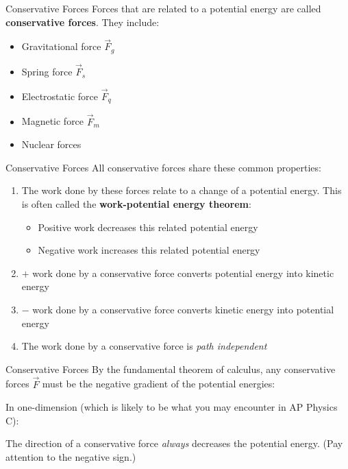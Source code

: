 \documentclass[12pt,compress,aspectratio=169]{beamer}
\begin{document}
\begin{frame}{Conservative Forces}
  Forces that are related to a potential energy are called
  \textbf{conservative forces}. They include:
  \begin{itemize}
  \item Gravitational force $\vec F_g$
  \item Spring force $\vec F_s$
  \item Electrostatic force $\vec F_q$
  \item Magnetic force $\vec F_m$
  \item Nuclear forces
  \end{itemize}
\end{frame}




\begin{frame}{Conservative Forces}
  All conservative forces share these common properties:
  \begin{enumerate}
  \item The work done by these forces relate to a change of a potential energy.
    This is often called the \textbf{work-potential energy theorem}:

    \begin{itemize}
    \item\vspace{-.17in}Positive work decreases this related potential energy
    \item Negative work increases this related potential energy
    \end{itemize}
  \item $+$ work done by a conservative force converts potential energy
    into kinetic energy
  \item $-$ work done by a conservative force converts kinetic energy
    into potential energy
  \item The work done by a conservative force is \emph{path independent}
  \end{enumerate}
\end{frame}



\begin{frame}{Conservative Forces}
  By the fundamental theorem of calculus, any conservative forces $\vec F$
  must be the negative gradient of the potential energies:


  In one-dimension (which is likely to be what you may encounter in AP Physics
  C):


  The direction of a conservative force \emph{always} decreases the potential
  energy. (Pay attention to the negative sign.)
\end{frame}
\end{document}

